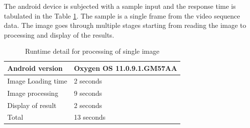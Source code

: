 	The android device is subjected with a sample input and the response time is tabulated in the Table \ref{table:response_of_android}. The sample is a single frame from the video sequence data. The image goes through multiple stages starting from reading the image to processing and display of the results. 
	
	\begin{table}[h]
		\begin{center}
			\begin{tabular}{ | l | p{3cm} |}
				\hline
				
				Android version & Oxygen OS 11.0.9.1.GM57AA \\ \hline
				Image Loading time & 2 seconds \\ \hline
				Image processing & 9 seconds \\ \hline
				Display of result & 2 seconds \\ \hline
				Total & 13 seconds \\ \hline
				\hline
			\end{tabular}
			\caption{Runtime detail for processing of single image}
			\label{table:response_of_android}
		\end{center}
	\end{table}    
    

